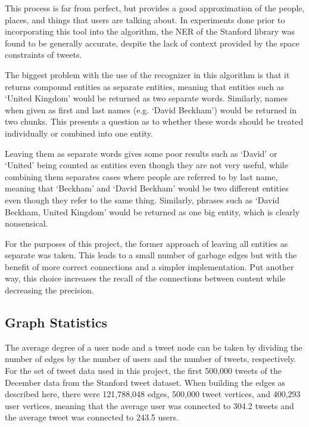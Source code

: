 This process is far from perfect, but provides a good approximation of the people, places, and things that users are talking about. In experiments done prior to incorporating this tool into the algorithm, the NER of the Stanford library was found to be generally accurate, despite the lack of context provided by the space constraints of tweets.

The biggest problem with the use of the recognizer in this algorithm is that it returns compound entities as separate entities, meaning that entities such as `United Kingdom' would be returned as two separate words. Similarly, names when given as first and last names (e.g. `David Beckham') would be returned in two chunks. This presents a question as to whether these words should be treated individually or combined into one entity.

Leaving them as separate words gives some poor results such as `David' or `United' being counted as entities even though they are not very useful, while combining them separates cases where people are referred to by last name, meaning that `Beckham' and `David Beckham' would be two different entities even though they refer to the same thing. Similarly, phrases such as `David Beckham, United Kingdom' would be returned as one big entity, which is clearly nonsensical.

For the purposes of this project, the former approach of leaving all entities as separate was taken. This leads to a small number of garbage edges but with the benefit of more correct connections and a simpler implementation. Put another way, this choice increases the recall of the connections between content while decreasing the precision.


\subsection{Graph Statistics}

The average degree of a user node and a tweet node can be taken by dividing the number of edges by the number of users and the number of tweets, respectively. For the set of tweet data used in this project, the first 500,000 tweets of the December data from the Stanford tweet dataset. When building the edges as described here, there were  121,788,048 edges, 500,000 tweet vertices, and 400,293 user vertices, meaning that the average user was connected to 304.2 tweets and the average tweet was connected to 243.5 users.

